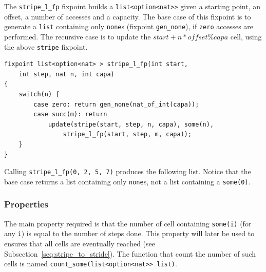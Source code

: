 \documentclass[oneside]{article}
\begin{document}
The \texttt{stripe\_l\_fp} fixpoint builds a \texttt{list<option<nat>>} given a starting point, an offset, a number of accesses and a capacity. The base case of this fixpoint is to generate a \texttt{list} containing only \texttt{none}s (fixpoint \texttt{gen\_none}), if \texttt{zero} accesses are performed. The recursive case is to update the $start + n*offset \%capa$ cell, using the above \texttt{stripe} fixpoint.

\begin{definition}
	\begin{lstlisting}
fixpoint list<option<nat> > stripe_l_fp(int start,
	int step, nat n, int capa)
{
	switch(n) {
		case zero: return gen_none(nat_of_int(capa));
		case succ(m): return 
			update(stripe(start, step, n, capa), some(n), 
				stripe_l_fp(start, step, m, capa));
	}
}
 	\end{lstlisting}
\end{definition}

\begin{example}
	Calling \texttt{stripe\_l\_fp(0, 2, 5, 7)} produces the following list. Notice that the base case returns a list containing only \texttt{none}s, not a list containing a \texttt{some(0)}. 
	\begin{center}
	\end{center}
\end{example}


\subsubsection{Properties}
The main property required is that the number of cell containing \texttt{some(i)} (for any \texttt{i}) is equal to the number of steps done. This property will later be used to ensures that all cells are eventually reached (see Subsection~\ref{seq:stripe_to_stride}). The function that count the number of such cells is named \texttt{count\_some(list<option<nat>> list)}.
\end{document}

